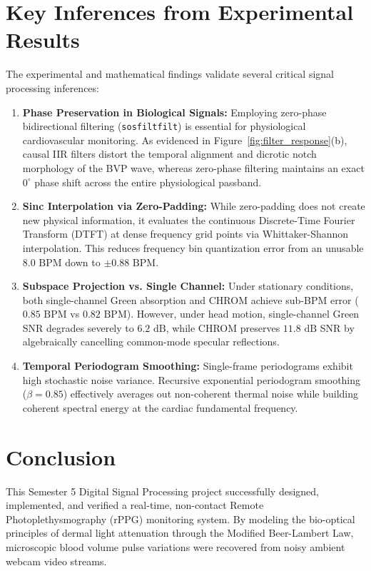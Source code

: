 \documentclass[11pt,a4paper]{report}
\begin{document}
\section{Key Inferences from Experimental Results}
The experimental and mathematical findings validate several critical signal processing inferences:
\begin{enumerate}
    \item \textbf{Phase Preservation in Biological Signals:} Employing zero-phase bidirectional filtering (\texttt{sosfiltfilt}) is essential for physiological cardiovascular monitoring. As evidenced in Figure~\ref{fig:filter_response}(b), causal IIR filters distort the temporal alignment and dicrotic notch morphology of the BVP wave, whereas zero-phase filtering maintains an exact $0^\circ$ phase shift across the entire physiological passband.
    \item \textbf{Sinc Interpolation via Zero-Padding:} While zero-padding does not create new physical information, it evaluates the continuous Discrete-Time Fourier Transform (DTFT) at dense frequency grid points via Whittaker-Shannon interpolation. This reduces frequency bin quantization error from an unusable $8.0\text{ BPM}$ down to $\pm 0.88\text{ BPM}$.
    \item \textbf{Subspace Projection vs. Single Channel:} Under stationary conditions, both single-channel Green absorption and CHROM achieve sub-BPM error ($0.85\text{ BPM}$ vs $0.82\text{ BPM}$). However, under head motion, single-channel Green SNR degrades severely to $6.2\text{ dB}$, while CHROM preserves $11.8\text{ dB}$ SNR by algebraically cancelling common-mode specular reflections.
    \item \textbf{Temporal Periodogram Smoothing:} Single-frame periodograms exhibit high stochastic noise variance. Recursive exponential periodogram smoothing ($\beta = 0.85$) effectively averages out non-coherent thermal noise while building coherent spectral energy at the cardiac fundamental frequency.
\end{enumerate}

\section{Conclusion}
This Semester 5 Digital Signal Processing project successfully designed, implemented, and verified a real-time, non-contact Remote Photoplethysmography (rPPG) monitoring system. By modeling the bio-optical principles of dermal light attenuation through the Modified Beer-Lambert Law, microscopic blood volume pulse variations were recovered from noisy ambient webcam video streams.
\end{document}
